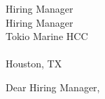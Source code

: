 \documentclass[10pt,letter]{letter}
\def\hm{Hiring Manager}
\begin{document}
\begin{letter}{\hm \\ Hiring Manager \\ Tokio Marine HCC \\ [Company Address] \\ Houston, TX}
    \opening{Dear \hm,}
    
    \setlength\parindent{.5in}
    
    
    
     
    
    \end{letter}
    
    
\end{document}
